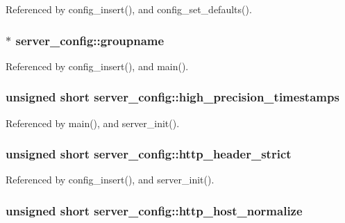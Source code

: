Referenced by config\-\_\-insert(), and config\-\_\-set\-\_\-defaults().

\hypertarget{structserver__config_a2d31977d5069399039cb03c46150983a}{
\subsubsection[{groupname}]{$\ast$ server\-\_\-config\-::groupname}}\label{structserver__config_a2d31977d5069399039cb03c46150983a}


Referenced by config\-\_\-insert(), and main().

\hypertarget{structserver__config_a78de0d577be8fcfd551e7b3045790245}{
\subsubsection[{high\-\_\-precision\-\_\-timestamps}]{\setlength{\rightskip}{0pt plus 5cm}unsigned short server\-\_\-config\-::high\-\_\-precision\-\_\-timestamps}}\label{structserver__config_a78de0d577be8fcfd551e7b3045790245}


Referenced by main(), and server\-\_\-init().

\hypertarget{structserver__config_aec43b7fbf466178f95d5e119a6f2ea25}{
\subsubsection[{http\-\_\-header\-\_\-strict}]{\setlength{\rightskip}{0pt plus 5cm}unsigned short server\-\_\-config\-::http\-\_\-header\-\_\-strict}}\label{structserver__config_aec43b7fbf466178f95d5e119a6f2ea25}


Referenced by config\-\_\-insert(), and server\-\_\-init().

\hypertarget{structserver__config_a3a4d7c20e77274eb8e27aa41f6a1d3b8}{
\subsubsection[{http\-\_\-host\-\_\-normalize}]{\setlength{\rightskip}{0pt plus 5cm}unsigned short server\-\_\-config\-::http\-\_\-host\-\_\-normalize}}\label{structserver__config_a3a4d7c20e77274eb8e27aa41f6a1d3b8}


